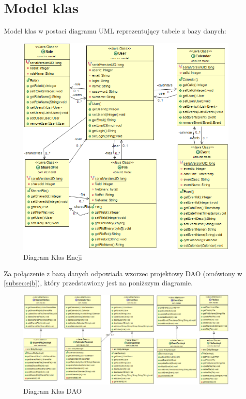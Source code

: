 \section{Model klas}
Model klas w postaci diagramu UML reprezentujący tabele z bazy danych:
\begin{figure}[H]
\centering
\includegraphics[scale=0.5]{ENTITIES}
\caption{\label{fig:uml_01}Diagram Klas Encji}
\end{figure}
\newpage
Za połączenie z bazą danych odpowiada wzorzec projektowy DAO (omówiony w \ref{subsec:ejb}), który przedstawiony jest na poniższym diagramie.
\begin{figure}[H]
\centering
\includegraphics[scale=0.5,angle=90,origin=c]{DAO_UML}
\caption{\label{fig:uml_02}Diagram Klas DAO}
\end{figure}